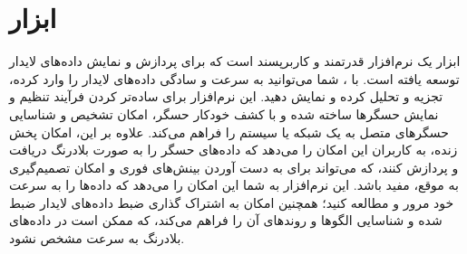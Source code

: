 \section{ابزار }
ابزار  یک نرم‌افزار قدرتمند و کاربرپسند است که برای پردازش و نمایش داده‌های لایدار توسعه یافته است. با ، شما می‌توانید به سرعت و سادگی داده‌های لایدار  را وارد کرده، تجزیه و تحلیل کرده و نمایش دهید. این نرم‌افزار برای ساده‌تر کردن فرآیند تنظیم و نمایش حسگرها ساخته شده و با کشف خودکار حسگر، امکان تشخیص و شناسایی حسگرهای متصل به یک شبکه یا سیستم را فراهم می‌کند. علاوه بر این، امکان پخش زنده، به کاربران این امکان را می‌دهد که داده‌های حسگر را به صورت بلادرنگ دریافت و پردازش کنند، که می‌تواند برای به دست آوردن بینش‌های فوری و امکان تصمیم‌گیری به موقع، مفید باشد. این نرم‌افزار به شما این امکان را می‌دهد که داده‌ها را به سرعت خود مرور و مطالعه کنید؛ همچنین امکان به اشتراک گذاری ضبط‌ داده‌های لایدار ضبط شده و شناسایی الگوها و روندهای آن را فراهم می‌کند، که ممکن است در داده‌های بلادرنگ به سرعت مشخص نشود.